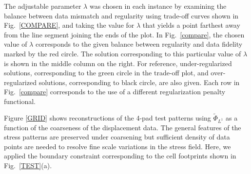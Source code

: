 \documentclass[aps,prl,reprint,twocolumn,groupedaddress,showpacs]{revtex4}
\begin{document}
The adjustable parameter $\lambda$ was chosen in each instance by
examining the balance between data mismatch and regularity using
trade-off curves shown in Fig.~\ref{COMPARE}, and taking the value
for $\lambda$ that yields a point farthest away from the line segment
joining the ends of the plot. In Fig.~\ref{compare}, the chosen value
of $\lambda$ corresponds to the given balance between regularity and
data fidelity marked by the red circle. The solution corresponding to
this particular value of $\lambda$ is shown in the middle column on
the right. For reference, under-regularized solutions, corresponding
to the green circle in the trade-off plot, and over-regularized
solutions, corresponding to black circle, are also given. Each row in
Fig.~\ref{compare} corresponds to the use of a different
regularization penalty functional. 

Figure \ref{GRID} shows reconstructions of the 4-pad test patterns
using $\tilde{\Phi}_{L^{1}}$ as a function of the coarseness of the
displacement data. The general features of the stress patterns are
preserved under coarsening but sufficient density of data points are
needed to resolve fine scale variations in the stress field. Here, we
applied the boundary constraint corresponding to the cell footprints
shown in Fig.~\ref{TEST}(a).
\end{document}
